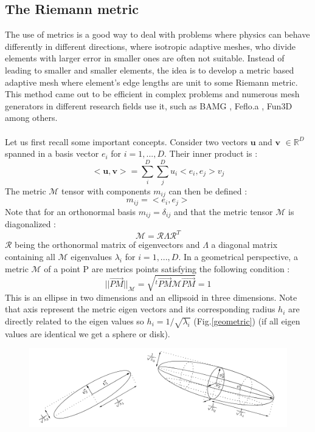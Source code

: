 \documentclass[11pt, a4paper, English]{report}
\begin{document}
\begin{appendix}
\subsection{The Riemann metric}
The use of metrics is a good way to deal with problems where physics can behave differently in different directions, where isotropic adaptive meshes, who divide elements with larger error in smaller ones are often not suitable. Instead of leading to smaller and smaller elements, the idea is to develop a metric based adaptive mesh where element's edge lengths are unit to some Riemann metric. This method came out to be efficient in complex problems and numerous mesh generators in different research fields use it, such as BAMG \cite{bamg}, Feflo.a \cite{Loseillemesh}, Fun3D \cite{fun3D} among others.
\\\\
Let us first recall some important concepts. Consider two vectors $\boldsymbol{u}$ and $\boldsymbol{v}$ $\in \mathbb{R}^D$ spanned in a basis vector $e_i$ for $i = 1,...,D$. Their inner product is :
$$<\boldsymbol{u}, \boldsymbol{v}> = \sum_i^D \sum_j^D u_i<e_i,e_j>v_j$$
The metric $\mathcal{M}$ tensor with components $m_{ij}$ can then be defined :
$$ m_{ij} = <e_i,e_j> $$
Note that for an orthonormal basis $m_{ij} = \delta_{ij}$ and that the metric tensor $\mathcal{M}$ is diagonalized :
$$ \mathcal{M} = \mathcal{R}\Lambda\mathcal{R}^T$$
$\mathcal{R}$ being the orthonormal matrix of eigenvectors and $\Lambda$ a  diagonal matrix containing all $\mathcal{M}$ eigenvalues $\lambda_i$ for $i = 1,...,D$. In a geometrical perspective, a metric $\mathcal{M}$ of a point P are metrics points satisfying the following condition \cite{Fredo}:
$$  ||\overrightarrow{PM}||_{\mathcal{M}}=\sqrt{^t \overrightarrow{PM} \mathcal{M} \overrightarrow{PM}} = 1   $$
This is an ellipse in two dimensions and an ellipsoid in three dimensions. Note that axis represent the metric eigen vectors and its corresponding radius $h_i$  are directly related to the eigen values so $h_i = 1/\sqrt{\lambda_i}$ (Fig.\ref{geometric}) (if all eigen values are identical we get a sphere or disk).
\begin{figure}[h!]
    \centering
    \includegraphics[width=\textwidth]{metric_geo.png}

\end{figure}
\end{appendix}
\end{document}
